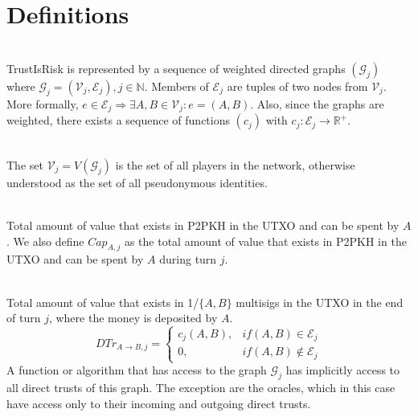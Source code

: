 \documentclass[11pt]{llncs}
\begin{document}
  \section{Definitions}
     \begin{definition}[Graph] \ \\
        TrustIsRisk is represented by a sequence of weighted directed graphs $\left(\mathcal{G}_j\right)$ where $\mathcal{G}_j =
        \left(\mathcal{V}_j, \mathcal{E}_j\right), j \in \mathbb{N}$. Members of $\mathcal{E}_j$ are tuples of two nodes from
        $\mathcal{V}_j$. More formally, $e \in \mathcal{E}_j \Rightarrow \exists A,B \in \mathcal{V}_j : e = \left(A,B\right)$.
        Also, since the graphs are weighted, there exists a sequence of functions $\left(c_j\right)$ with $c_j : \mathcal{E}_j
        \rightarrow \mathbb{R}^{+}$.
     \end{definition}
     \begin{definition}[Players] \ \\
        The set $\mathcal{V}_j = V\left(\mathcal{G}_j\right)$ is the set of all players in the network, otherwise understood
        as the set of all pseudonymous identities.
     \end{definition}
     \begin{definition} \ \\
       Total amount of value that exists in P2PKH in the UTXO and can be spent by $A$. We also define $Cap_{A,j}$ as
       the total amount of value that exists in P2PKH in the UTXO and can be spent by $A$ during turn $j$.
     \end{definition}
     \begin{definition} \ \\
        Total amount of value that exists in 1/$\{A,B\}$ multisigs in the UTXO in the end of turn $j$, where the money is
        deposited by $A$.
        \begin{equation}
           DTr_{A \rightarrow B, j} =
              \begin{cases}
                 c_j\left(A, B\right), & if \left(A, B\right) \in \mathcal{E}_j \\
                 0, & if \left(A, B\right) \notin \mathcal{E}_j
              \end{cases}
        \end{equation}
        A function or algorithm that has access to the graph $\mathcal{G}_j$ has implicitly access to all direct trusts
        of this graph. The exception are the oracles, which in this case have access only to their incoming and outgoing
        direct trusts.
     \end{definition}
\end{document}
